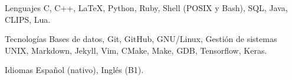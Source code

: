 
\begin{cvskills}

\cvskill%
	{Lenguajes} %
	{C, C++, LaTeX, Python, Ruby, Shell (POSIX y Bash), SQL, Java, CLIPS, Lua.} %

\cvskill%
	{Tecnologías}
	{Bases de datos, Git, GitHub, GNU/Linux, Gestión de sistemas UNIX, Markdown, Jekyll, Vim, CMake, Make, GDB, Tensorflow, Keras.}

\cvskill%
	{Idiomas}
	{Español (nativo), Inglés (B1).}

\end{cvskills}
